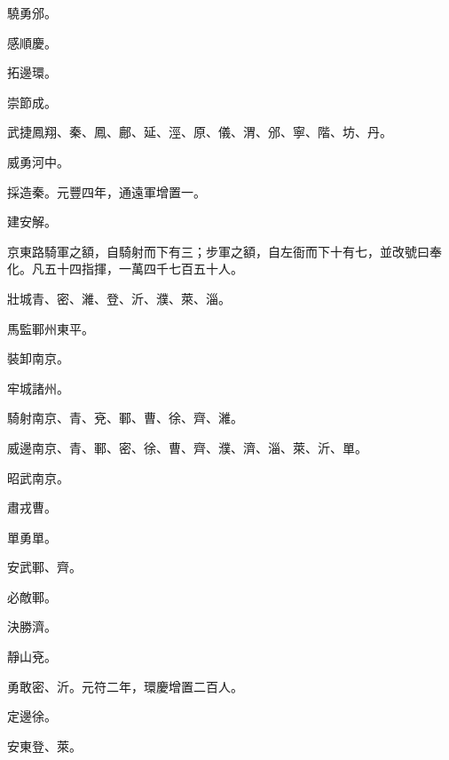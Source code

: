 \begin{pinyinscope}
 驍勇邠。



 感順慶。



 拓邊環。



 崇節成。



 武捷鳳翔、秦、鳳、鄜、延、涇、原、儀、渭、邠、寧、階、坊、丹。



 威勇河中。



 採造秦。元豐四年，通遠軍增置一。



 建安解。



 京東路騎軍之額，自騎射而下有三；步軍之額，自左衙而下十有七，並改號曰奉化。凡五十四指揮，一萬四千七百五十人。



 壯城青、密、濰、登、沂、濮、萊、淄。



 馬監鄆州東平。



 裝卸南京。



 牢城諸州。



 騎射南京、青、兗、鄆、曹、徐、齊、濰。



 威邊南京、青、鄆、密、徐、曹、齊、濮、濟、淄、萊、沂、單。



 昭武南京。



 肅戎曹。



 單勇單。



 安武鄆、齊。



 必敵鄆。



 決勝濟。



 靜山兗。



 勇敢密、沂。元符二年，環慶增置二百人。



 定邊徐。



 安東登、萊。




\end{pinyinscope}
